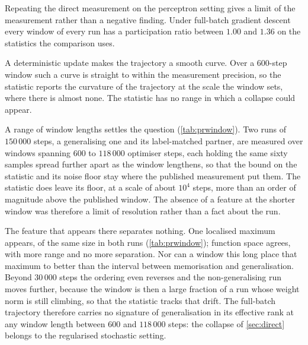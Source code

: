 \documentclass{article}
\begin{document}
Repeating the direct measurement on the perceptron setting gives a limit of the measurement rather
than a negative finding. Under full-batch gradient descent every
window of every run has a participation ratio between $1.00$ and $1.36$ on the statistics the
comparison uses.

A deterministic update makes the trajectory a smooth curve. Over a $600$-step window such a curve
is straight to within the measurement precision, so the statistic reports the curvature of the
trajectory at the scale the window sets, where there is almost none. The statistic has no range
in which a collapse could appear.

A range of window lengths settles the question (\cref{tab:prwindow}). Two runs of $150\,000$ steps,
a generalising one and its label-matched partner, are measured over windows spanning $600$ to
$118\,000$ optimiser steps, each holding the same sixty samples spread further apart as the window
lengthens, so that the bound on the statistic and its noise floor stay where the published
measurement put them. The statistic does leave its floor, at a scale of about $10^4$ steps, more than an order of magnitude above the published window. The absence of a feature at the shorter window was
therefore a limit of resolution rather than a fact about the run.

The feature that appears there separates nothing. One localised maximum appears, of the same size
in both runs (\cref{tab:prwindow}); function space agrees, with more range and no more separation.
Nor can a window this long place that maximum to better than the interval between memorisation and
generalisation. Beyond $30\,000$ steps the ordering even reverses and the non-generalising run
moves further, because the window is then a large fraction of a run whose weight norm is still
climbing, so that the statistic tracks that drift. The full-batch trajectory therefore carries no
signature of generalisation in its effective rank at any window length between $600$ and
$118\,000$ steps: the collapse of \cref{sec:direct} belongs to the regularised stochastic
setting.
\end{document}
